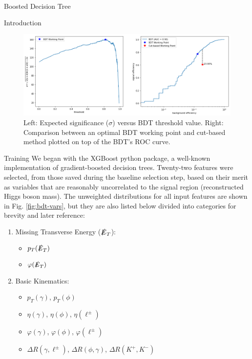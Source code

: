 \begin{section}{Boosted Decision Tree}
\begin{subsection}{Introduction}
\begin{figure}[htb]
\begin{center}
\includegraphics[width=.95\linewidth]{Dissertation/fig/bdt-vs-cuts.png}
\end{center}
\caption{Left: Expected significance ($\sigma$) versus BDT threshold value. Right: Comparison between an optimal BDT working point and cut-based method plotted on top of the BDT's ROC curve.}
\label{fig:bdt-vs-cuts}
\end{figure}
\end{subsection}
\begin{subsection}{Training}
We began with the XGBoost python package, a well-known implementation of gradient-boosted decision trees. Twenty-two features were selected, from those saved during the baseline selection step, based on their merit as variables that are reasonably uncorrelated to the signal region (reconstructed Higgs boson mass). The unweighted distributions for all input features are shown in Fig. \ref{fig:bdt-vars}, but they are also listed below divided into categories for brevity and later reference:
\begin{enumerate}[(i.)]
    \item Missing Transverse Energy ($\slashed{E}_{T}$):
    \begin{itemize}
        \item $p_{T}(\slashed{E}_{T})$
        \item $\varphi(\slashed{E}_{T})$
    \end{itemize}
    \item Basic Kinematics:
    \begin{itemize}
        \item $p_{T}(\gamma)$, $p_{T}(\phi)$
        \item $\eta(\gamma)$, $\eta(\phi)$, $\eta(\ell^{\pm})$
        \item $\varphi(\gamma)$, $\varphi(\phi)$, $\varphi(\ell^{\pm})$
        \item $\Delta R(\gamma, \ell^{\pm})$, $\Delta R(\phi, \gamma)$, $\Delta R(K^{+}, K^{-})$

\end{itemize}
\end{enumerate}
\end{subsection}
\end{section}
